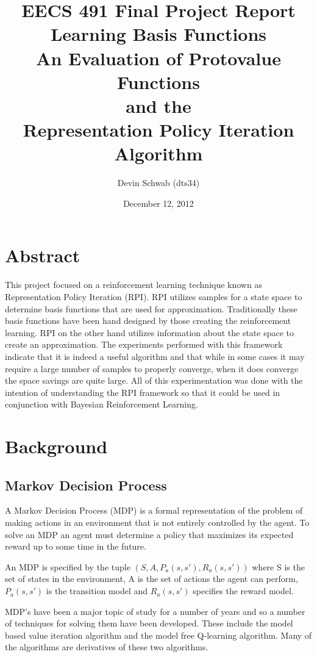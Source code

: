 \documentclass[12pt, letterpaper, final]{report}
\author{Devin Schwab (dts34)}
\title{EECS 491 Final Project Report \\ 
\vspace{5 mm}
Learning Basis Functions\\ 
\vspace{5 mm}
 An Evaluation of Protovalue Functions\\
 and the\\
 Representation Policy Iteration Algorithm}
\date{December 12, 2012}
\begin{document}
\maketitle

\section{Abstract}

This project focused on a reinforcement learning technique known as
Representation Policy Iteration (RPI). RPI utilizes samples for a
state space to determine basis functions that are used for
approximation. Traditionally these basis functions have been hand
designed by those creating the reinforcement learning. RPI on the
other hand utilizes information about the state space to create an
approximation. The experiments performed with this framework indicate
that it is indeed a useful algorithm and that while in some cases it may require a
large number of samples to properly converge, when it does converge
the space savings are quite large. All of this experimentation was
done with the intention of understanding the RPI framework so that it
could be used in conjunction with Bayesian Reinforcement Learning.

\tableofcontents
\newpage
\listoffigures

\section{Background}

\subsection*{Markov Decision Process}

A Markov Decision Process (MDP) is a formal representation of the
problem of making actions in an environment that is not entirely
controlled by the agent. To solve an MDP an agent must determine a
policy that maximizes its expected reward up to some time in the
future.

An MDP is specified by the tuple $(S, A, P_a(s,s'), R_a(s,s'))$ where
S is the set of states in the environment, A is the set of actions the
agent can perform, $P_a(s,s')$ is the transition model and $R_a(s,s')$
specifies the reward model. \cite{soumya_ray_eecs_2012} \cite{richard_s._sutton_reinforcement_2005}

MDP's have been a major topic of study for a number of years and so a
number of techniques for solving them have been developed. These
include the model based value iteration algorithm and the model free
Q-learning algorithm. Many of the algorithms are derivatives of these
two algorithms.
\end{document}

